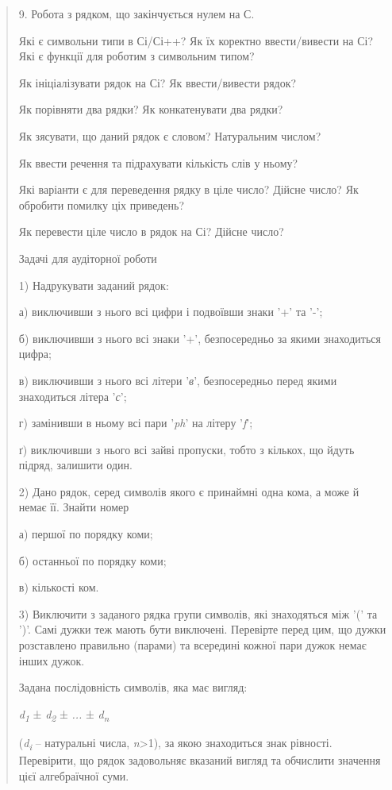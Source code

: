 \documentclass[]{article}
\begin{document}
\begin{quote}
9. Робота з рядком, що закінчується нулем на С.

Які є символьни типи в Сі/Сі++? Як їх коректно ввести/вивести на Сі? Які
є функції для роботим з символьним типом?

Як ініціалізувати рядок на Сі? Як ввести/вивести рядок?

Як порівняти два рядки? Як конкатенувати два рядки?

Як зясувати, що даний рядок є словом? Натуральним числом?

Як ввести речення та підрахувати кількість слів у ньому?

Які варіанти є для переведення рядку в ціле число? Дійсне число? Як
обробити помилку ціх приведень?

Як перевести ціле число в рядок на Сі? Дійсне число?

Задачі для аудіторної роботи

1) Надрукувати заданий рядок:

а) виключивши з нього всі цифри і подвоївши знаки '+' та '-';

б) виключивши з нього всі знаки '+', безпосередньо за якими знаходиться
цифра;

в) виключивши з нього всі літери '\emph{в}', безпосередньо перед якими
знаходиться літера '\emph{с}';

г) замінивши в ньому всі пари '\emph{ph}' на літеру '\emph{f}';

ґ) виключивши з нього всі зайві пропуски, тобто з кількох, що йдуть
підряд, залишити один.

2) Дано рядок, серед символів якого є принаймні одна кома, а може й
немає її. Знайти номер

а) першої по порядку коми;

б) останньої по порядку коми;

в) кількості ком.

3) Виключити з заданого рядка групи символів, які знаходяться між '(' та
')'. Самі дужки теж мають бути виключені. Перевірте перед цим, що дужки
розставлено правильно (парами) та всередині кожної пари дужок немає
інших дужок.

Задана послідовність символів, яка має вигляд:

\emph{d\textsubscript{1}} ± \emph{d\textsubscript{2}} ± \emph{...} ±
\emph{d\textsubscript{n}}

(\emph{d\textsubscript{i }}-- натуральні числа,
\emph{n}\textgreater{}1), за якою знаходиться знак рівності. Перевірити,
що рядок задовольняє вказаний вигляд та обчислити значення цієї
алгебраїчної суми.


\end{quote}
\end{document}
